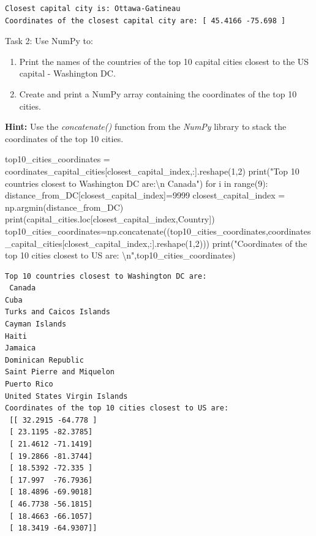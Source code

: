 \documentclass[
  letterpaper,
  DIV=11,
  numbers=noendperiod]{scrreprt}
\newenvironment{Shaded}{\begin{snugshade}}{\end{snugshade}}
\newcommand{\BuiltInTok}[1]{\textcolor[rgb]{0.00,0.23,0.31}{#1}}
\newcommand{\CharTok}[1]{\textcolor[rgb]{0.13,0.47,0.30}{#1}}
\newcommand{\ControlFlowTok}[1]{\textcolor[rgb]{0.00,0.23,0.31}{#1}}
\newcommand{\DecValTok}[1]{\textcolor[rgb]{0.68,0.00,0.00}{#1}}
\newcommand{\KeywordTok}[1]{\textcolor[rgb]{0.00,0.23,0.31}{#1}}
\newcommand{\NormalTok}[1]{\textcolor[rgb]{0.00,0.23,0.31}{#1}}
\newcommand{\OperatorTok}[1]{\textcolor[rgb]{0.37,0.37,0.37}{#1}}
\newcommand{\StringTok}[1]{\textcolor[rgb]{0.13,0.47,0.30}{#1}}
\begin{document}
\begin{verbatim}
Closest capital city is: Ottawa-Gatineau
Coordinates of the closest capital city are: [ 45.4166 -75.698 ]
\end{verbatim}

Task 2: Use NumPy to:

\begin{enumerate}
\def\labelenumi{\arabic{enumi}.}
\item
  Print the names of the countries of the top 10 capital cities closest
  to the US capital - Washington DC.
\item
  Create and print a NumPy array containing the coordinates of the top
  10 cities.
\end{enumerate}

\textbf{Hint:} Use the \emph{concatenate()} function from the
\emph{NumPy} library to stack the coordinates of the top 10 cities.

\begin{Shaded}
\begin{Highlighting}[]
\NormalTok{top10\_cities\_coordinates }\OperatorTok{=}\NormalTok{ coordinates\_capital\_cities[closest\_capital\_index,:].reshape(}\DecValTok{1}\NormalTok{,}\DecValTok{2}\NormalTok{)}
\BuiltInTok{print}\NormalTok{(}\StringTok{"Top 10 countries closest to Washington DC are:}\CharTok{\textbackslash{}n}\StringTok{ Canada"}\NormalTok{)}
\ControlFlowTok{for}\NormalTok{ i }\KeywordTok{in} \BuiltInTok{range}\NormalTok{(}\DecValTok{9}\NormalTok{):}
\NormalTok{    distance\_from\_DC[closest\_capital\_index]}\OperatorTok{=}\DecValTok{9999}
\NormalTok{    closest\_capital\_index }\OperatorTok{=}\NormalTok{ np.argmin(distance\_from\_DC)}
    \BuiltInTok{print}\NormalTok{(capital\_cities.loc[closest\_capital\_index,}\StringTok{\textquotesingle{}Country\textquotesingle{}}\NormalTok{])}
\NormalTok{    top10\_cities\_coordinates}\OperatorTok{=}\NormalTok{np.concatenate((top10\_cities\_coordinates,coordinates\_capital\_cities[closest\_capital\_index,:].reshape(}\DecValTok{1}\NormalTok{,}\DecValTok{2}\NormalTok{)))}
\BuiltInTok{print}\NormalTok{(}\StringTok{"Coordinates of the top 10 cities closest to US are: }\CharTok{\textbackslash{}n}\StringTok{"}\NormalTok{,top10\_cities\_coordinates)}
\end{Highlighting}
\end{Shaded}

\begin{verbatim}
Top 10 countries closest to Washington DC are:
 Canada
Cuba
Turks and Caicos Islands
Cayman Islands
Haiti
Jamaica
Dominican Republic
Saint Pierre and Miquelon
Puerto Rico
United States Virgin Islands
Coordinates of the top 10 cities closest to US are: 
 [[ 32.2915 -64.778 ]
 [ 23.1195 -82.3785]
 [ 21.4612 -71.1419]
 [ 19.2866 -81.3744]
 [ 18.5392 -72.335 ]
 [ 17.997  -76.7936]
 [ 18.4896 -69.9018]
 [ 46.7738 -56.1815]
 [ 18.4663 -66.1057]
 [ 18.3419 -64.9307]]
\end{verbatim}
\end{document}
